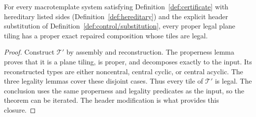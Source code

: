 \begin{theorem}
\label{thm:compose}
For every macrotemplate system satisfying Definition~\ref{def:certificate}
with hereditary listed sides (Definition~\ref{def:hereditary})
and the explicit header substitution of Definition~\ref{def:control/substitution},
every proper legal plane tiling has a proper exact repaired composition
whose tiles are legal.
\end{theorem}
\begin{proof}
Construct $\mathcal T'$ by assembly and reconstruction. The properness
lemma proves that it is a plane tiling, is proper, and decomposes exactly
to the input. Its reconstructed types are either noncentral, central cyclic,
or central acyclic. The three legality lemmas cover these disjoint cases.
Thus every tile of $\mathcal T'$ is legal. The conclusion uses the same
properness and legality predicates as the input, so the theorem can be
iterated. The header modification is what provides this closure.
\end{proof}

